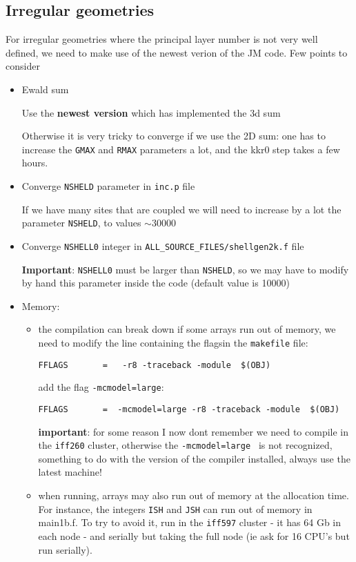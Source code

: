 \documentclass[11pt,fleqn]{book} %
\begin{document}
\subsection{Irregular geometries}
For irregular geometries where the principal layer number is not very well defined,
we need to make use of the newest verion of the JM code. Few points to consider
\begin{itemize}
\item Ewald sum

Use the \textbf{newest version} which has implemented the 3d sum

Otherwise it is very tricky to converge if we use the 2D sum: one has to increase the \verb|GMAX|
and \verb|RMAX| parameters a lot, and the kkr0 step takes a few hours.

\item Converge \verb|NSHELD| parameter in \verb|inc.p| file

If we have many sites that are coupled we will need to increase by a lot the parameter
\verb|NSHELD|, to values $\sim 30000$

\item Converge \verb|NSHELL0| integer in \verb|ALL_SOURCE_FILES/shellgen2k.f| file

\textbf{Important}: \verb|NSHELL0| must be larger than \verb|NSHELD|, so we may have to
modify by hand this parameter inside the code (default value is 10000)



\item Memory:
\begin{itemize}
\item the compilation can break down if some arrays run out of memory, we need to
modify the line containing the flagsin the \verb|makefile| file:
\begin{VBox}
\begin{verbatim}
FFLAGS       =   -r8 -traceback -module  $(OBJ)
\end{verbatim}
\end{VBox}
add the flag \verb|-mcmodel=large|:
\begin{VBox}
\begin{verbatim}
FFLAGS       =  -mcmodel=large -r8 -traceback -module  $(OBJ)
\end{verbatim}
\end{VBox}
\textbf{important}: for some reason I now dont remember we need to compile in the \verb|iff260|
cluster, otherwise the \verb|-mcmodel=large | is not recognized, something to do with the version of
the compiler installed, always use the latest machine!

\item when running, arrays may also run out of memory at the allocation time. For instance,
the integers \verb|ISH| and \verb|JSH| can run out of memory in main1b.f. To try to avoid it,
run in the \verb|iff597| cluster - it has 64 Gb in each node - and serially but taking the full node
(ie ask for 16 CPU's but run serially).

\end{itemize}

\end{itemize}
\end{document}
